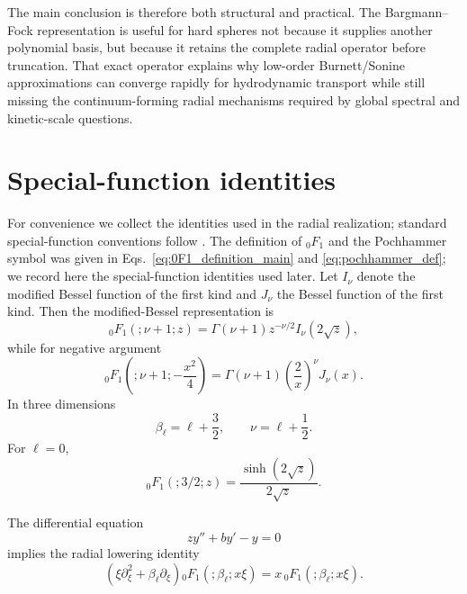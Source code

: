 \documentclass[11pt]{article}
\numberwithin{equation}{section}
\theoremstyle{definition}
\begin{document}
The main conclusion is therefore both structural and practical.  The
Bargmann--Fock representation is useful for hard spheres not because it
supplies another polynomial basis, but because it retains the complete radial
operator before truncation.  That exact operator explains why low-order
Burnett/Sonine approximations can converge rapidly for hydrodynamic transport
while still missing the continuum-forming radial mechanisms required by
global spectral and kinetic-scale questions.





\appendix

\section{Special-function identities}

For convenience we collect the identities used in the radial realization;
standard special-function conventions follow \cite{NIST2010}.
The definition of ${}_0F_1$ and the Pochhammer symbol was given in
Eqs.~\eqref{eq:0F1_definition_main} and \eqref{eq:pochhammer_def}; we record
here the special-function identities used later.
Let $I_\nu$ denote the modified Bessel function of the first kind and
$J_\nu$ the Bessel function of the first kind.  Then the modified-Bessel
representation is
\begin{equation}
 {}_0F_1(; \nu+1;z)
 =
 \Gamma(\nu+1)
 z^{-\nu/2}I_\nu(2\sqrt z),
\end{equation}
while for negative argument
\begin{equation}
 {}_0F_1\!\left(;\nu+1;-\frac{x^2}{4}\right)
 =
 \Gamma(\nu+1)
 \left(\frac2x\right)^\nu
 J_\nu(x).
\end{equation}
In three dimensions
\begin{equation}
 \beta_\ell=\ell+\frac32,
 \qquad
 \nu=\ell+\frac12.
\end{equation}
For $\ell=0$,
\begin{equation}
 {}_0F_1(;3/2;z)
 =
 \frac{\sinh(2\sqrt z)}{2\sqrt z}.
\end{equation}

The differential equation
\begin{equation}
 z y''+b y'-y=0
\end{equation}
implies the radial lowering identity
\begin{equation}
 \left(
 \xi\partial_\xi^2+\beta_\ell\partial_\xi
 \right)
 {}_0F_1(; \beta_\ell;x\xi)
 =
 x\,{}_0F_1(; \beta_\ell;x\xi).
\end{equation}
\end{document}
